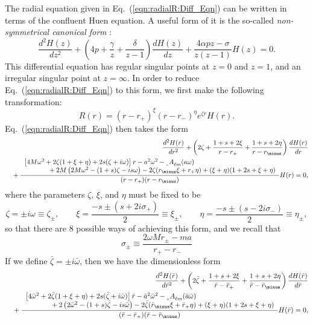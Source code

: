 \documentclass[11pt]{article}
\newcommand{\scA}[4][]{{}_{{}_{#2}}A^{#1}_{#3}(#4)}
\begin{document}
The radial equation given in Eq.~(\ref{eqn:radialR:Diff_Eqn}) can be
written in terms of the confluent Huen equation.  A useful form of it
is the so-called {\em non-symmetrical canonical form} :
\begin{equation}
\frac{d^2H(z)}{dz^2} 
+ \left(4p + \frac\gamma{z}+\frac\delta{z-1}\right)\frac{dH(z)}{dz}
+ \frac{4\alpha pz -\sigma}{z(z-1)}H(z)=0.
\end{equation}
This differential equation has regular singular points at $z=0$ and
$z=1$, and an irregular singular point at $z=\infty$.  In order to
reduce Eq.~(\ref{eqn:radialR:Diff_Eqn}) to this form, we first make
the following transformation:
\begin{equation}
R(r) = (r-r_+)^\xi(r-r_\minus)^\eta e^{\zeta r}H(r).
\end{equation}
Eq.~(\ref{eqn:radialR:Diff_Eqn}) then takes the form
\begin{eqnarray}
&&\frac{d^2H(r)}{dr^2}
+\left(2\zeta +\frac{1+s+2\xi}{r-r_+}+\frac{1+s+2\eta}{r-r_\minus}\right)
\frac{dH(r)}{dr} \\
&&\mbox{}
+\frac{
\begin{array}{l}
\left[4M\omega^2 + 2\zeta(1+\xi+\eta) + 2s(\zeta+i\omega)\right]r
-a^2\omega^2 - \scA{s}{\ell{m}}{a\omega} \\
\mbox{\hspace{0.5in}} + 2M\left(2M\omega^2 - (1+s)\zeta - is\omega\right) 
- 2\zeta(r_\minus\xi + r_+\eta) + (\xi+\eta) (1+2s+\xi+\eta)
\end{array}
}{(r-r_+)(r-r_\minus)}H(r)=0, \nonumber
\end{eqnarray}
where the parameters $\zeta$, $\xi$, and $\eta$ must be fixed to be
\begin{equation}
  \zeta=\pm i\omega\equiv\zeta_\pm,\qquad
  \xi=\frac{-s\pm(s + 2i\sigma_+)}2\equiv\xi_\pm,\qquad
  \eta=\frac{-s\pm(s - 2i\sigma_\minus)}2\equiv\eta_\pm,
\end{equation}
so that there are 8 possible ways of achieving this form, and we recall that
\begin{equation}
 \sigma_\pm\equiv\frac{2\omega{M}r_\pm - ma}{r_+-r_\minus}
\end{equation}
If we define $\bar\zeta=\pm i\bar\omega$, then we have the dimensionless form
\begin{eqnarray}
&&\frac{d^2H(\bar{r})}{d\bar{r}^2}
+\left(2\bar\zeta +\frac{1+s+2\xi}{\bar{r}-\bar{r}_+}
+\frac{1+s+2\eta}{\bar{r}-\bar{r}_\minus}\right)
\frac{dH(\bar{r})}{d\bar{r}} \\
&&\mbox{}
+\frac{
\begin{array}{l}
\left[4\bar\omega^2 + 2\bar\zeta(1+\xi+\eta) 
+ 2s(\bar\zeta+i\bar\omega)\right]\bar{r}
-\bar{a}^2\bar\omega^2 - \scA{s}{\ell{m}}{\bar{a}\bar\omega} \\
\mbox{\hspace{0.5in}} + 2\left(2\bar\omega^2-(1+s)\bar\zeta-is\bar\omega\right) 
- 2\bar\zeta(\bar{r}_\minus\xi + \bar{r}_+\eta) + (\xi+\eta) (1+2s+\xi+\eta)
\end{array}
}{(\bar{r}-\bar{r}_+)(\bar{r}-\bar{r}_\minus)}H(\bar{r})=0, \nonumber
\end{eqnarray}
\end{document}
